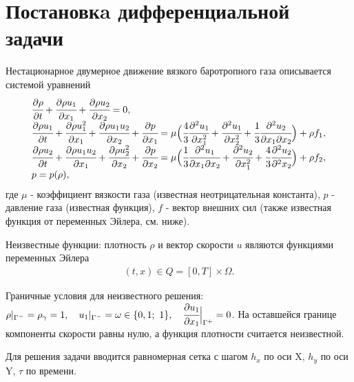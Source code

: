 \section{Постановкa дифференциальной задачи}

Нестационарное двумерное движение вязкого баротропного газа описывается системой уравнений
$$
\begin{array}{l}
\cfrac{\partial \rho}{\partial t} + \cfrac{\partial \rho u_1}{\partial x_1}+ \cfrac{\partial \rho u_2}{\partial x_2} = 0, \\
\cfrac{\partial \rho u_1}{\partial t} + \cfrac{\partial \rho u_1^2}{\partial x_1} + \cfrac{\partial \rho u_1 u_2}{\partial x_2} 
	+ \cfrac{\partial p}{\partial x_1} 
	= \mu \Big(\cfrac{4}{3}\cfrac{\partial^2 u_1}{\partial x_1^2} + \cfrac{\partial^2 u_1}{\partial x_2^2}
	+  \cfrac{1}{3}\cfrac{\partial^2 u_2}{\partial x_1\partial x_2} \Big) + \rho f_1, \\
\cfrac{\partial \rho u_2}{\partial t} + \cfrac{\partial \rho u_1 u_2}{\partial x_1} + \cfrac{\partial \rho u_2^2}{\partial x_2}
	+ \cfrac{\partial p}{\partial x_2} 
	= \mu \Big(\cfrac{1}{3}\cfrac{\partial^2 u_1}{\partial x_1\partial x_2} + \cfrac{\partial^2 u_2}{\partial x_1^2}
	+  \cfrac{4}{3}\cfrac{\partial^2 u_2}{\partial^2 x_2} \Big) + \rho f_2, \\
p = p (\rho),
\end{array}
$$
где $\mu$ - коэффициент вязкости газа (известная неотрицательная константа), $p$ - давление газа (известная функция), $f$ - вектор внешних сил
(также известная функция от переменных Эйлера, см. ниже).

Неизвестные функции: плотность $\rho$ и вектор скорости $u$ являются функциями переменных Эйлера 
\begin{gather*}
(t, x) \in Q = [0, T] \times \Omega.
\end{gather*}

Граничные условия для неизвестного решения: $\rho|_{\Gamma^-} = \rho_{\gamma} = 1,\quad u_1|_{\Gamma^-} = \omega \in \{0,1;\  1\},\quad \cfrac{\partial u_1}{\partial x_1}\Big|_{\Gamma^+} = 0$. На оставшейся границе компоненты скорости равны нулю, а функция плотности считается неизвестной.

Для решения задачи вводится равномерная сетка с шагом $h_x$ по оси X, $h_y$ по оси Y, $\tau$ по времени.
